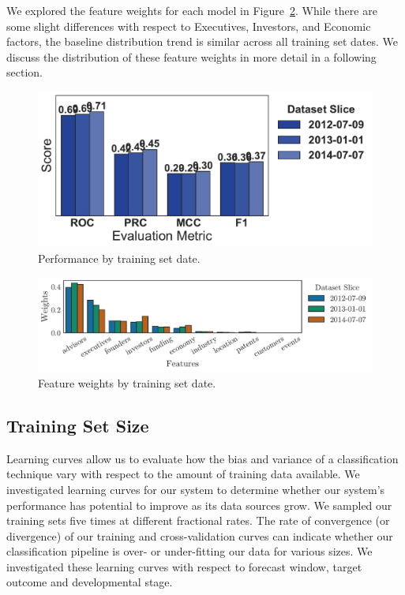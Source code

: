 \documentclass[../thesis/thesis.tex]{subfiles}
\begin{document}
We explored the feature weights for each model in Figure~\ref{fig:evaluation:features_slice}. While there are some slight differences with respect to Executives, Investors, and Economic factors, the baseline distribution trend is similar across all training set dates. We discuss the distribution of these feature weights in more detail in a following section.

\begin{figure}[!htb]
    \centering
    \includegraphics[width=\textwidth]{../figures/evaluation/performance_slice}
    \caption[Performance by training set date]{Performance by training set date.}
    \label{fig:evaluation:performance_slice}
\end{figure}

\begin{figure}[!htb]
    \centering
    \includegraphics[width=\textwidth]{../figures/evaluation/features_slice}
    \caption[Feature weights by training set date]{Feature weights by training set date.}
    \label{fig:evaluation:features_slice}
\end{figure}

\subsection{Training Set Size}

Learning curves allow us to evaluate how the bias and variance of a classification technique vary with respect to the amount of training data available. We investigated learning curves for our system to determine whether our system's performance has potential to improve as its data sources grow. We sampled our training sets five times at different fractional rates. The rate of convergence (or divergence) of our training and cross-validation curves can indicate whether our classification pipeline is over- or under-fitting our data for various sizes. We investigated these learning curves with respect to forecast window, target outcome and developmental stage.
\end{document}
